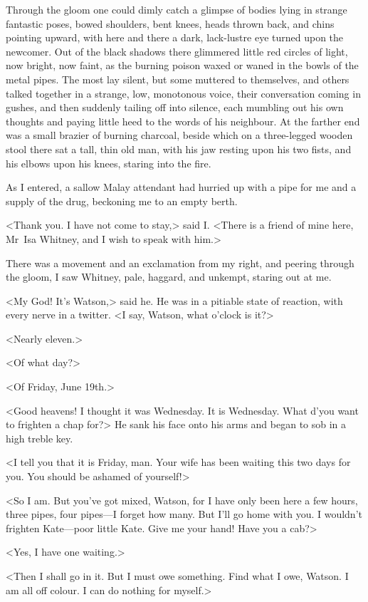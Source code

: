 Through the gloom one could dimly catch a glimpse of bodies lying in strange fantastic poses, bowed shoulders, bent knees, heads thrown back, and chins pointing upward, with here and there a dark, lack-lustre eye turned upon the newcomer. Out of the black shadows there glimmered little red circles of light, now bright, now faint, as the burning poison waxed or waned in the bowls of the metal pipes. The most lay silent, but some muttered to themselves, and others talked together in a strange, low, monotonous voice, their conversation coming in gushes, and then suddenly tailing off into silence, each mumbling out his own thoughts and paying little heed to the words of his neighbour. At the farther end was a small brazier of burning charcoal, beside which on a three-legged wooden stool there sat a tall, thin old man, with his jaw resting upon his two fists, and his elbows upon his knees, staring into the fire.

As I entered, a sallow Malay attendant had hurried up with a pipe for me and a supply of the drug, beckoning me to an empty berth.

<Thank you. I have not come to stay,> said I\@. <There is a friend of mine here, Mr~Isa Whitney, and I wish to speak with him.>

There was a movement and an exclamation from my right, and peering through the gloom, I saw Whitney, pale, haggard, and unkempt, staring out at me.

<My God! It's Watson,> said he. He was in a pitiable state of reaction, with every nerve in a twitter. <I say, Watson, what o'clock is it?>

<Nearly eleven.>

<Of what day?>

<Of Friday, June 19th.>

<Good heavens! I thought it was Wednesday. It is Wednesday. What d'you want to frighten a chap for?> He sank his face onto his arms and began to sob in a high treble key.

<I tell you that it is Friday, man. Your wife has been waiting this two days for you. You should be ashamed of yourself!>

<So I am. But you've got mixed, Watson, for I have only been here a few hours, three pipes, four pipes—I forget how many. But I'll go home with you. I wouldn't frighten Kate—poor little Kate. Give me your hand! Have you a cab?>

<Yes, I have one waiting.>

<Then I shall go in it. But I must owe something. Find what I owe, Watson. I am all off colour. I can do nothing for myself.>

